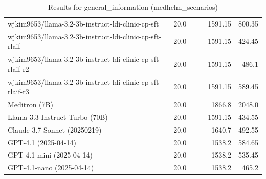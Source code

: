 \begin{table}[htp]
{\begin{tabular}{lrrrrr}
wjkim9653/llama-3.2-3b-instruct-ldi-clinic-cp-sft & 20.0 &  &  & 1591.15 & 800.35 \\
wjkim9653/llama-3.2-3b-instruct-ldi-clinic-cp-sft-rlaif & 20.0 &  &  & 1591.15 & 424.45 \\
wjkim9653/llama-3.2-3b-instruct-ldi-clinic-cp-sft-rlaif-r2 & 20.0 &  &  & 1591.15 & 486.1 \\
wjkim9653/llama-3.2-3b-instruct-ldi-clinic-cp-sft-rlaif-r3 & 20.0 &  &  & 1591.15 & 589.45 \\
Meditron (7B) & 20.0 &  &  & 1866.8 & 2048.0 \\
Llama 3.3 Instruct Turbo (70B) & 20.0 &  &  & 1591.15 & 434.55 \\
Claude 3.7 Sonnet (20250219) & 20.0 &  &  & 1640.7 & 492.55 \\
GPT-4.1 (2025-04-14) & 20.0 &  &  & 1538.2 & 584.65 \\
GPT-4.1-mini (2025-04-14) & 20.0 &  &  & 1538.2 & 535.45 \\
GPT-4.1-nano (2025-04-14) & 20.0 &  &  & 1538.2 & 465.2 \\
\bottomrule
\end{tabular}}
\caption{Results for general_information (medhelm_scenarios)}
\label{fig:general_information (medhelm_scenarios)}
\end{table}